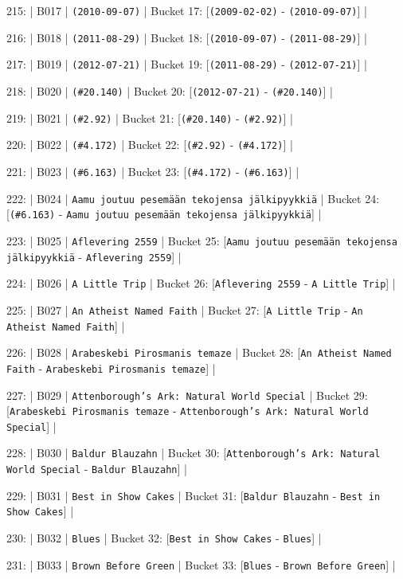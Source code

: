 \documentclass[11pt,a4paper]{article}
\begin{document}
{215: | B017 | \texttt{(2010-09-07)} | Bucket 17: [\texttt{(2009-02-02)} - \texttt{(2010-09-07)}] |

216: | B018 | \texttt{(2011-08-29)} | Bucket 18: [\texttt{(2010-09-07)} - \texttt{(2011-08-29)}] |

217: | B019 | \texttt{(2012-07-21)} | Bucket 19: [\texttt{(2011-08-29)} - \texttt{(2012-07-21)}] |

218: | B020 | \texttt{(\#20.140)} | Bucket 20: [\texttt{(2012-07-21)} - \texttt{(\#20.140)}] |

219: | B021 | \texttt{(\#2.92)} | Bucket 21: [\texttt{(\#20.140)} - \texttt{(\#2.92)}] |

220: | B022 | \texttt{(\#4.172)} | Bucket 22: [\texttt{(\#2.92)} - \texttt{(\#4.172)}] |

221: | B023 | \texttt{(\#6.163)} | Bucket 23: [\texttt{(\#4.172)} - \texttt{(\#6.163)}] |

222: | B024 | \texttt{Aamu joutuu pesemään tekojensa jälkipyykkiä} | Bucket 24: [\texttt{(\#6.163)} - \texttt{Aamu joutuu pesemään tekojensa jälkipyykkiä}] |

223: | B025 | \texttt{Aflevering 2559} | Bucket 25: [\texttt{Aamu joutuu pesemään tekojensa jälkipyykkiä} - \texttt{Aflevering 2559}] |

224: | B026 | \texttt{A Little Trip} | Bucket 26: [\texttt{Aflevering 2559} - \texttt{A Little Trip}] |

225: | B027 | \texttt{An Atheist Named Faith} | Bucket 27: [\texttt{A Little Trip} - \texttt{An Atheist Named Faith}] |

226: | B028 | \texttt{Arabeskebi Pirosmanis temaze} | Bucket 28: [\texttt{An Atheist Named Faith} - \texttt{Arabeskebi Pirosmanis temaze}] |

227: | B029 | \texttt{Attenborough's Ark: Natural World Special} | Bucket 29: [\texttt{Arabeskebi Pirosmanis temaze} - \texttt{Attenborough's Ark: Natural World Special}] |

228: | B030 | \texttt{Baldur Blauzahn} | Bucket 30: [\texttt{Attenborough's Ark: Natural World Special} - \texttt{Baldur Blauzahn}] |

229: | B031 | \texttt{Best in Show Cakes} | Bucket 31: [\texttt{Baldur Blauzahn} - \texttt{Best in Show Cakes}] |

230: | B032 | \texttt{Blues} | Bucket 32: [\texttt{Best in Show Cakes} - \texttt{Blues}] |

231: | B033 | \texttt{Brown Before Green} | Bucket 33: [\texttt{Blues} - \texttt{Brown Before Green}] |

}
\end{document}
